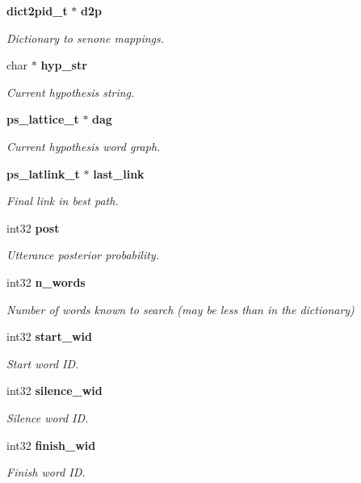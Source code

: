 \begin{DoxyCompactItemize}
\textbf{ dict2pid\+\_\+t} $\ast$ \textbf{ d2p}
\begin{DoxyCompactList}\small\item\em Dictionary to senone mappings. \end{DoxyCompactList}\item 
char $\ast$ \textbf{ hyp\+\_\+str}
\begin{DoxyCompactList}\small\item\em Current hypothesis string. \end{DoxyCompactList}\item 
\textbf{ ps\+\_\+lattice\+\_\+t} $\ast$ \textbf{ dag}
\begin{DoxyCompactList}\small\item\em Current hypothesis word graph. \end{DoxyCompactList}\item 
\textbf{ ps\+\_\+latlink\+\_\+t} $\ast$ \textbf{ last\+\_\+link}
\begin{DoxyCompactList}\small\item\em Final link in best path. \end{DoxyCompactList}\item 
int32 \textbf{ post}
\begin{DoxyCompactList}\small\item\em Utterance posterior probability. \end{DoxyCompactList}\item 
\mbox{\label{structps__search__s_ad4d98deb905bd664ec44313ea0065b1a}} 
int32 \textbf{ n\+\_\+words}
\begin{DoxyCompactList}\small\item\em Number of words known to search (may be less than in the dictionary) \end{DoxyCompactList}\item 
int32 \textbf{ start\+\_\+wid}
\begin{DoxyCompactList}\small\item\em Start word ID. \end{DoxyCompactList}\item 
int32 \textbf{ silence\+\_\+wid}
\begin{DoxyCompactList}\small\item\em Silence word ID. \end{DoxyCompactList}\item 
int32 \textbf{ finish\+\_\+wid}
\begin{DoxyCompactList}\small\item\em Finish word ID. \end{DoxyCompactList}\end{DoxyCompactItemize}


